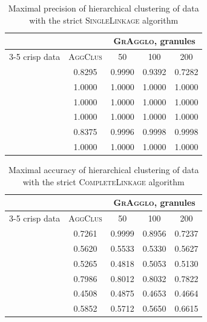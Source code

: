 \documentclass{amcs}
\newcommand{\blobs}{\dataset{blobs}}
\newcommand{\circles}{\dataset{circles}}
\newcommand{\corners}{\dataset{corners}}
\newcommand{\crescents}{\dataset{crescents}}
\newcommand{\laguna}{\dataset{laguna}}
\newcommand{\spheres}{\dataset{spheres}}
\newcommand{\procedura}[1]{\textsc{#1}}
\newcommand{\SingleLinkage}{\procedura{Si\-ng\-le\-Lin\-ka\-ge}}
\newcommand{\CompleteLinkage}{\procedura{Com\-ple\-te\-Lin\-ka\-ge}}
\newcommand{\abbrAgglomerativeClustering}{\procedura{AggClus}}
\newcommand{\MojAlg}{\procedura{GrAgglo}}
\begin{document}
\begin{table}
	\centering
   \caption{Maximal precision of hierarchical clustering of data with the strict \SingleLinkage{} algorithm}
	\label{id:tab:prec-sl-strict}
	\begin{tabular}{lcccc}
		\toprule
		&  & \multicolumn{3}{c}{\MojAlg, granules} \\
		\cmidrule(lr){3-5}
		{crisp data} & \abbrAgglomerativeClustering & 50  & 100  & 200   \\
		\midrule
		\blobs\ & 0.8295 & 0.9990 & 0.9392 & 0.7282 \\
		\circles\ & 1.0000 & 1.0000 & 1.0000 & 1.0000 \\
		\corners\ & 1.0000 & 1.0000 & 1.0000 & 1.0000 \\
		\crescents\ & 1.0000 & 1.0000 & 1.0000 & 1.0000 \\
		\laguna\ & 0.8375 & 0.9996 & 0.9998 & 0.9998 \\
		\spheres\ & 1.0000 & 1.0000 & 1.0000 & 1.0000 \\
		\bottomrule
	\end{tabular}
\end{table}  

\begin{table}
	\centering
   \caption{Maximal accuracy of hierarchical clustering of data with the strict \CompleteLinkage{} algorithm}
	\label{id:tab:acc-cl-strict}
	\begin{tabular}{lcccc}
		\toprule
		&  & \multicolumn{3}{c}{\MojAlg, granules} \\
		\cmidrule(lr){3-5}
		{crisp data} & \abbrAgglomerativeClustering & 50  & 100  & 200   \\
		\midrule
		\blobs\ & 0.7261 & 0.9999 & 0.8956 & 0.7237 \\
		\circles\ & 0.5620 & 0.5533 & 0.5330 & 0.5627 \\
		\corners\ & 0.5265 & 0.4818 & 0.5053 & 0.5130 \\
		\crescents\ & 0.7986 & 0.8012 & 0.8032 & 0.7822 \\
		\laguna\ & 0.4508 & 0.4875 & 0.4653 & 0.4664 \\
		\spheres\ & 0.5852 & 0.5712 & 0.5650 & 0.6615 \\
		\bottomrule
	\end{tabular}
\end{table}  
\end{document}

